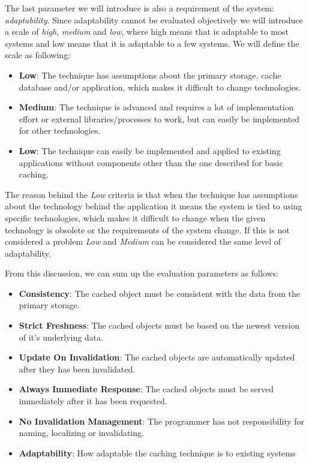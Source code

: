 
The last parameter we will introduce is also a requirement of the system: \emph{adaptability}. Since adaptability cannot be evaluated objectively we will introduce a scale of \emph{high}, \emph{medium} and \emph{low}, where high means that is adaptable to most systems and low means that it is adaptable to a few systems. We will define the scale as following:

\begin{itemize}
  \item \textbf{Low}: The technique has assumptions about the primary storage, cache database and/or application, which makes it difficult to change technologies.
  \item \textbf{Medium}: The technique is advanced and requires a lot of implementation effort or external libraries/processes to work, but can easily be implemented for other technologies.
  \item \textbf{Low}: The technique can easily be implemented and applied to existing applications without components other than the one described for basic caching.
\end{itemize}

The reason behind the \emph{Low} criteria is that when the technique has assumptions about the technology behind the application it means the system is tied to using specific technologies, which makes it difficult to change when the given technology is obsolete or the requirements of the system change. If this is not considered a problem \emph{Low} and \emph{Medium} can be considered the same level of adaptability.

From this discussion, we can sum up the evaluation parameters as follows:

\begin{itemize}
  \item \textbf{Consistency}: The cached object must be consistent with the data from the primary storage.
  \item \textbf{Strict Freshness}: The cached objects must be based on the newest version of it's underlying data.
  \item \textbf{Update On Invalidation}: The cached objects are automatically updated after they has been invalidated.
  \item \textbf{Always Immediate Response}: The cached objects must be served immediately after it has been requested.
  \item \textbf{No Invalidation Management}: The programmer has not responsibility for naming, localizing or invalidating.
  \item \textbf{Adaptability}: How adaptable the caching technique is to existing systems
\end{itemize}


